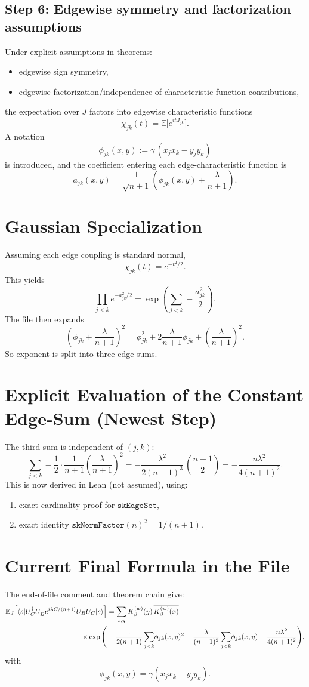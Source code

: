 \documentclass[11pt]{article}
\newcommand{\E}{\mathbb{E}}
\newcommand{\ket}[1]{\lvert #1\rangle}
\newcommand{\bra}[1]{\langle #1\rvert}
\begin{document}
\subsection{Step 6: Edgewise symmetry and factorization assumptions}
Under explicit assumptions in theorems:
\begin{itemize}
  \item edgewise sign symmetry,
  \item edgewise factorization/independence of characteristic function contributions,
\end{itemize}
the expectation over \(J\) factors into edgewise characteristic functions
\[
  \chi_{jk}(t)=\E\big[e^{itJ_{jk}}\big].
\]
A notation
\[
  \phi_{jk}(x,y):=\gamma\,(x_jx_k-y_jy_k)
\]
is introduced, and the coefficient entering each edge-characteristic function is
\[
  a_{jk}(x,y)=\frac{1}{\sqrt{n+1}}\left(\phi_{jk}(x,y)+\frac{\lambda}{n+1}\right).
\]

\section{Gaussian Specialization}
Assuming each edge coupling is standard normal,
\[
  \chi_{jk}(t)=e^{-t^2/2}.
\]
This yields
\[
  \prod_{j<k} e^{-a_{jk}^2/2}
  = \exp\left(\sum_{j<k}-\frac{a_{jk}^2}{2}\right).
\]
The file then expands
\[
  \left(\phi_{jk}+\frac{\lambda}{n+1}\right)^2
  = \phi_{jk}^2 + 2\frac{\lambda}{n+1}\phi_{jk} + \left(\frac{\lambda}{n+1}\right)^2.
\]
So exponent is split into three edge-sums.

\section{Explicit Evaluation of the Constant Edge-Sum (Newest Step)}
The third sum is independent of \((j,k)\):
\[
  \sum_{j<k}-\frac12\cdot\frac{1}{n+1}\left(\frac{\lambda}{n+1}\right)^2
  = -\frac{\lambda^2}{2(n+1)^3}\,\binom{n+1}{2}
  = -\frac{n\lambda^2}{4(n+1)^2}.
\]
This is now derived in Lean (not assumed), using:
\begin{enumerate}
  \item exact cardinality proof for \(\texttt{skEdgeSet}\),
  \item exact identity \(\texttt{skNormFactor}(n)^2=1/(n+1)\).
\end{enumerate}

\section{Current Final Formula in the File}
The end-of-file comment and theorem chain give:
\begin{align*}
\E_J\!\left[\bra{s}U_C^\dagger U_B^\dagger e^{i\lambda C/(n+1)}U_B U_C\ket{s}\right]
&= \sum_{x,y}K_\beta^{(w)}(y)\,\overline{K_\beta^{(w)}(x)} \notag\\
\quad\times \exp\Bigg( &
-\frac{1}{2(n+1)} \sum_{j<k}\! \phi_{jk}(x,y)^2  \notag
-\frac{\lambda}{(n+1)^2}\sum_{j<k}\! \phi_{jk}(x,y)
-\frac{n\lambda^2}{4(n+1)^2}
\Bigg),
\end{align*}
with
\[
\phi_{jk}(x,y)=\gamma(x_jx_k-y_jy_k).
\]
\end{document}
